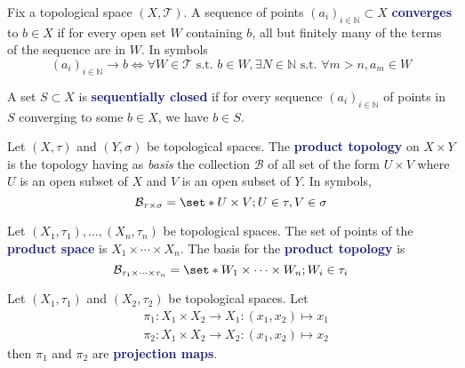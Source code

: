 \documentclass[11pt]{article}
\numberwithin{equation}{section}
\newcommand{\navy}[1]{\textcolor{MidnightBlue}{\bf #1}}
\theoremstyle{definition}
\theoremstyle{definition}
\def\Set{\set*}%
\def\ss{\subset}
\newcommand{\1}{\mathbbm 1}
\def\t{\tau}
\newcommand{\NN}{\mathbb N}
\newcommand{\tT}{\mathcal T}
\newcommand{\bB}{\mathcal B}
\begin{document}
\begin{definition}[Converges]
Fix a topological space $(X,\tT)$. A sequence of points $(a_i)_{i \in \NN} \ss X$ \navy{converges} to $b \in X$ if for every open set $W$ containing $b$, all but finitely many of the terms of the sequence are in $W$. In symbols
\begin{equation*}
(a_i)_{i \in \NN} \to b \iff \forall W\in \tT \text{ s.t. } b \in W, \exists N \in \NN \text{ s.t. } \forall m > n, a_m \in W
\end{equation*}

\end{definition}

\begin{definition}
A set $S \ss X$ is \navy{sequentially closed} if for every sequence $(a_i)_{i \in \NN}$ of points in $S$ converging to some $b \in X$, we have $b \in S$.
\end{definition}

\begin{definition}
Let $(X,\t)$ and $(Y,\sigma)$ be topological spaces. The \navy{product topology} on $X \times Y$ is the topology having as \emph{basis} the collection $\bB$ of all set of the form $U \times V$ where $U$ is an open subset of $X$ and $V$ is an open subset of $Y$. In symbols,
\begin{equation}
\bB_{\t \times \sigma} = \Set{U \times V; U \in \t, V \in \sigma}
\end{equation}
\end{definition}

\begin{definition}
Let $(X_1,\t_1), \ldots, (X_n,\t_n)$ be topological spaces. The set of points of the \navy{product space} is $X_1 \times \cdots \times X_n$. The basis for the \navy{product topology} is
\begin{equation}
\bB_{\t_1 \times \cdots \times \t_n} = \Set{W_1 \times \cdots \times W_n; W_i \in \t_i}
\end{equation}
\end{definition}

\begin{definition}
Let $(X_1,\t_1)$ and $(X_2,\t_2)$ be topological spaces. Let
\begin{align*}
&\pi_1:X_1 \times X_2 \to X_1 : (x_1,x_2) \mapsto x_1 \\
&\pi_2:X_1 \times X_2 \to X_2 : (x_1,x_2) \mapsto x_2
\end{align*}
then $\pi_1$ and $\pi_2$ are \navy{projection maps}.
\end{definition}
\end{document}

